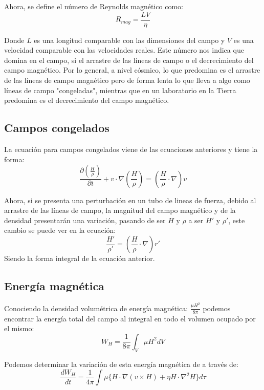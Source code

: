 Ahora, se define el número de Reynolds magnético como:
\begin{equation}
R_{mag}=\frac{LV}{\eta}
\end{equation}

Donde $L$ es una longitud comparable con las dimensiones del campo y $V$ es una velocidad comparable con las velocidades reales. Este número nos indica que domina en el campo, si el arrastre de las líneas de campo o el decrecimiento del campo magnético. Por lo general, a nivel cósmico, lo que predomina es el arrastre de las líneas de campo magnético pero de forma lenta lo que lleva a algo como líneas de campo "congeladas", mientras que en un laboratorio en la Tierra predomina es el decrecimiento del campo magnético.

\subsection{Campos congelados}
La ecuación para campos congelados viene de las ecuaciones anteriores y tiene la forma:
\begin{equation}
\frac{\partial\left( \frac{H}{\rho} \right)}{\partial t}+v\cdot \nabla \left( \frac{H}{\rho} \right)=\left( \frac{H}{\rho}\cdot \nabla \right)v
\end{equation}

Ahora, si se presenta una perturbación en un tubo de lineas de fuerza, debido al arrastre de las líneas de campo, la magnitud del campo magnético y de la densidad presentarán una variación, pasando de ser $H$ y $\rho$ a ser $H'$ y $\rho'$, este cambio se puede ver en la ecuación:
\begin{equation}
\frac{H'}{\rho'}=\left( \frac{H}{\rho} \cdot \nabla\right)r'
\end{equation}
Siendo la forma integral de la ecuación anterior.

\subsection{Energía magnética}
Conociendo la densidad volumétrica de energía magnética: $\frac{\mu H^{2}}{8\pi}$ podemos encontrar la energía total del campo al integral en todo el volumen ocupado por el mismo:
\begin{equation}
W_{H}=\frac{1}{8\pi}\int_{V} \mu H^{2}dV
\end{equation}

Podemos determinar la variación de esta energía magnética de a través de:
\begin{equation}
\frac{d W_{H}}{dt}=\frac{1}{4\pi }\int \mu\{H\cdot \nabla(v\times H)+\eta H\cdot \nabla ^{2}H\}d \tau
\end{equation}

